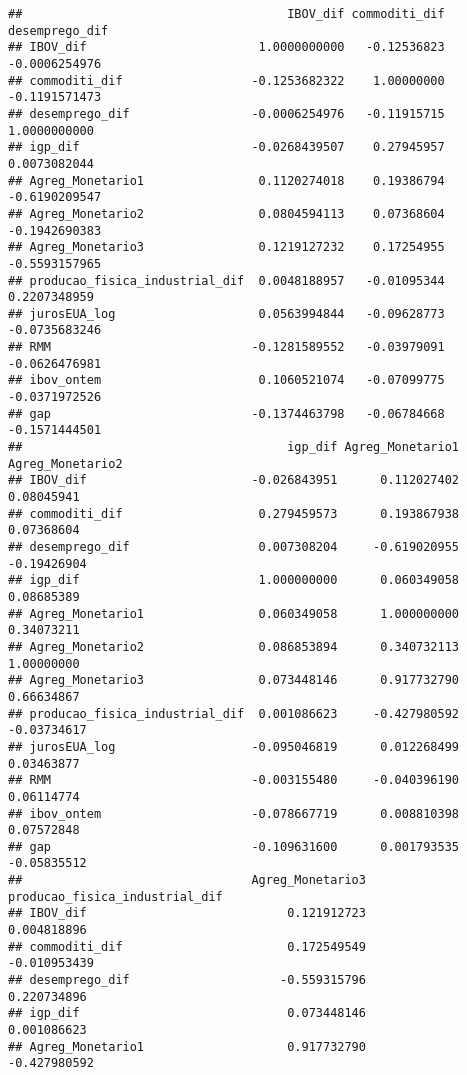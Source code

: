 \documentclass[
]{article}
\begin{document}
\begin{verbatim}
##                                     IBOV_dif commoditi_dif desemprego_dif
## IBOV_dif                        1.0000000000   -0.12536823  -0.0006254976
## commoditi_dif                  -0.1253682322    1.00000000  -0.1191571473
## desemprego_dif                 -0.0006254976   -0.11915715   1.0000000000
## igp_dif                        -0.0268439507    0.27945957   0.0073082044
## Agreg_Monetario1                0.1120274018    0.19386794  -0.6190209547
## Agreg_Monetario2                0.0804594113    0.07368604  -0.1942690383
## Agreg_Monetario3                0.1219127232    0.17254955  -0.5593157965
## producao_fisica_industrial_dif  0.0048188957   -0.01095344   0.2207348959
## jurosEUA_log                    0.0563994844   -0.09628773  -0.0735683246
## RMM                            -0.1281589552   -0.03979091  -0.0626476981
## ibov_ontem                      0.1060521074   -0.07099775  -0.0371972526
## gap                            -0.1374463798   -0.06784668  -0.1571444501
##                                     igp_dif Agreg_Monetario1 Agreg_Monetario2
## IBOV_dif                       -0.026843951      0.112027402       0.08045941
## commoditi_dif                   0.279459573      0.193867938       0.07368604
## desemprego_dif                  0.007308204     -0.619020955      -0.19426904
## igp_dif                         1.000000000      0.060349058       0.08685389
## Agreg_Monetario1                0.060349058      1.000000000       0.34073211
## Agreg_Monetario2                0.086853894      0.340732113       1.00000000
## Agreg_Monetario3                0.073448146      0.917732790       0.66634867
## producao_fisica_industrial_dif  0.001086623     -0.427980592      -0.03734617
## jurosEUA_log                   -0.095046819      0.012268499       0.03463877
## RMM                            -0.003155480     -0.040396190       0.06114774
## ibov_ontem                     -0.078667719      0.008810398       0.07572848
## gap                            -0.109631600      0.001793535      -0.05835512
##                                Agreg_Monetario3 producao_fisica_industrial_dif
## IBOV_dif                            0.121912723                    0.004818896
## commoditi_dif                       0.172549549                   -0.010953439
## desemprego_dif                     -0.559315796                    0.220734896
## igp_dif                             0.073448146                    0.001086623
## Agreg_Monetario1                    0.917732790                   -0.427980592

\end{verbatim}
\end{document}
